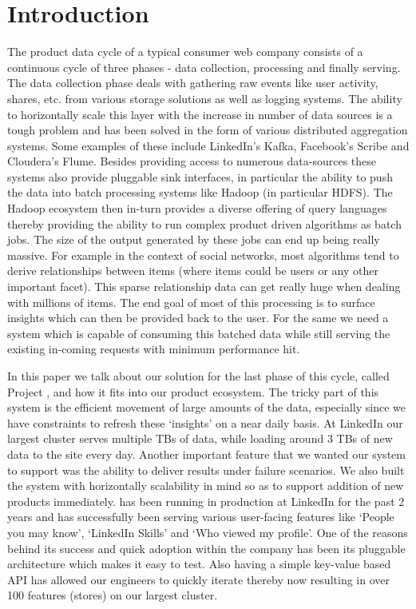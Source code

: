 \section{Introduction}
\label{sec:introduction}
The product data cycle of a typical consumer web company consists of a continuous cycle of three phases - data collection, processing and finally serving. The data collection phase deals with gathering raw events like user activity, shares, etc. from various storage solutions as well as logging systems. The ability to horizontally scale this layer with the increase in number of data sources is a tough problem and has been solved in the form of various distributed aggregation systems. Some examples of these include LinkedIn's Kafka\cite{kafka}, Facebook's Scribe\cite{scribe} and Cloudera's Flume\cite{flume}. Besides providing access to numerous data-sources these systems also provide pluggable sink interfaces, in particular the ability to push the data into batch processing systems like Hadoop (in particular HDFS)\cite{hadoop}. The Hadoop ecosystem then in-turn provides a diverse offering of query languages thereby providing the ability to run complex product driven algorithms as batch jobs. The size of the output generated by these jobs can end up being really massive. For example in the context of social networks, most algorithms tend to derive relationships between items (where items could be users or any other important facet). This sparse relationship data can get really huge when dealing with millions of items. The end goal of most of this processing is to surface insights which can then be provided back to the user. For the same we need a system which is capable of consuming this batched data while still serving the existing in-coming requests with minimum performance hit. 

In this paper we talk about our solution for the last phase of this cycle, called Project \projectname{}, and how it fits into our product ecosystem. The tricky part of this system is the efficient movement of large amounts of the data, especially since we have constraints to refresh these `insights' on a near daily basis. At LinkedIn our largest cluster serves multiple TBs of data, while loading around 3 TBs of new data to the site every day. Another important feature that we wanted our system to support was the ability to deliver results under failure scenarios. We also built the system with horizontally scalability in mind so as to support addition of new products immediately. \projectname{} has been running in production at LinkedIn for the past 2 years and has successfully been serving various user-facing features like `People you may know', `LinkedIn Skills' and `Who viewed my profile'. One of the reasons behind its success and quick adoption within the company has been its pluggable architecture which makes it easy to test. Also having a simple key-value based API has allowed our engineers to quickly iterate thereby now resulting in over 100 features (stores) on our largest cluster.

